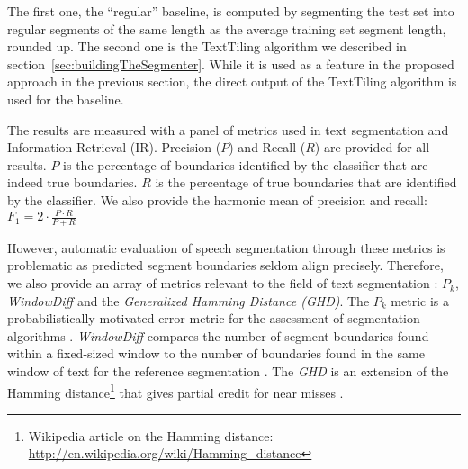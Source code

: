 The first one, the ``regular'' baseline, is computed by segmenting the test set into regular segments of the same length as the average training set segment length, rounded up. The second one is the TextTiling algorithm we described in section~\ref{sec:buildingTheSegmenter}.
While it is used as a feature in the proposed approach in the previous section, the direct output of the TextTiling algorithm is used for the baseline.


The results are measured with a panel of metrics used in text segmentation and Information Retrieval (IR).
%
Precision ($P$) and Recall ($R$) are provided for all results. $P$ is the percentage of boundaries identified by the classifier that are indeed true boundaries. $R$ is the percentage of true boundaries that are identified by the classifier. 
We also provide the harmonic mean of precision and recall:
$  F_1 = 2 \cdot \frac{P \cdot R}{P + R}$

However, automatic evaluation of speech segmentation through these metrics is problematic as predicted segment boundaries seldom align precisely. 
Therefore, %
 we also provide an array of metrics relevant to the field of text segmentation : ${P_{k}}$, \textit{WindowDiff} and the \textit{Generalized Hamming Distance (GHD)}.
%
The ${P_{k}}$ metric is a probabilistically motivated error metric for the assessment of segmentation algorithms \cite{beeferman1999statistical}.
%
\textit{WindowDiff} compares the number of segment boundaries found within a fixed-sized window to the number of boundaries found in the same window of text for the reference segmentation \cite{pevzner2002critique}.
%
The \textit{GHD} is an extension of the Hamming distance\footnote{Wikipedia article on the Hamming distance: \url{http://en.wikipedia.org/wiki/Hamming_distance}} that gives partial credit for near misses \cite{bookstein2002generalized}.



